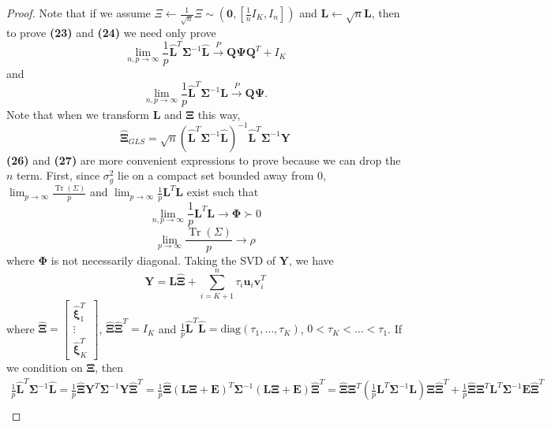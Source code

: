 \documentclass{article}
\DeclareMathOperator{\Tr}{Tr}
\begin{document}
\begin{proof}
Note that if we assume $\Xi \leftarrow \frac{1}{\sqrt{n}}\Xi \sim \left( \bm{0},\left[\frac{1}{n} I_K, I_n \right] \right)$ and $\bm{L} \leftarrow \sqrt{n}\bm{L}$, then to prove \textbf{(23)} and \textbf{(24)} we need only prove
\begin{equation}
\lim_{n,p \to \infty} \frac{1}{p}\hat{\bm{L}}^T \bm{\Sigma}^{-1}\hat{\bm{L}} \stackrel{P}{\to} \bm{Q}\bm{\Psi}\bm{Q}^T + I_K
\end{equation}
and
\begin{equation}
\lim_{n,p \to \infty} \frac{1}{p}\hat{\bm{L}}^T \bm{\Sigma}^{-1}\bm{L} \stackrel{P}{\to} \bm{Q}\bm{\Psi}.
\end{equation}
Note that when we transform $\bm{L}$ and $\bm{\Xi}$ this way,
\begin{equation}
\hat{\bm{\Xi}}_{GLS} = \sqrt{n} \left( \hat{\bm{L}}^T \bm{\Sigma}^{-1}\hat{\bm{L}} \right)^{-1}\hat{\bm{L}}^T \bm{\Sigma}^{-1}\bm{Y}
\end{equation}
\textbf{(26)} and \textbf{(27)} are more convenient expressions to prove because we can drop the $n$ term. First, since $\sigma_{g}^2$ lie on a compact set bounded away from 0, $\lim_{p \to \infty} \frac{\Tr\left( \Sigma \right)}{p}$ and $\lim_{p \to \infty} \frac{1}{p}\bm{L}^T \bm{L}$ exist such that
\begin{equation}
\lim_{n, p \to \infty} \frac{1}{p}\bm{L}^T \bm{L} \to \bm{\Phi} \succ 0
\end{equation} 
\begin{equation}
\lim_{p \to \infty} \frac{\Tr\left( \Sigma \right)}{p} \to \rho
\end{equation}
where $\bm{\Phi}$ is not necessarily diagonal. Taking the SVD of $\bm{Y}$, we have
\begin{equation}
\bm{Y} = \hat{\bm{L}}\hat{\bm{\Xi}} + \sum\limits_{i=K+1}^n \tau_i \bm{u}_i \bm{v}_i^T
\end{equation}
where $\hat{\bm{\Xi}} = \left[ \begin{matrix}
\hat{\bm{\xi}}_1^T \\
\vdots\\
\hat{\bm{\xi}}_K^T
\end{matrix} \right]$, $\hat{\bm{\Xi}} \hat{\bm{\Xi}}^T = I_K$ and $\frac{1}{p}\hat{\bm{L}}^T \hat{\bm{L}} = \text{diag}\left( \tau_1, \ldots, \tau_K \right)$, $0 < \tau_K < \ldots < \tau_1$. If we condition on $\bm{\Xi}$, then
\begin{multline}
\frac{1}{p}\hat{\bm{L}}^T \bm{\Sigma}^{-1}\hat{\bm{L}} = \frac{1}{p}\hat{\bm{\Xi}} \bm{Y}^T \bm{\Sigma}^{-1} \bm{Y}\hat{\bm{\Xi}}^T =  \frac{1}{p}\hat{\bm{\Xi}} \left( \bm{L}\bm{\Xi} + \bm{E} \right)^T \bm{\Sigma}^{-1}\left( \bm{L}\bm{\Xi} + \bm{E} \right) \hat{\bm{\Xi}}^T = \hat{\bm{\Xi}} \bm{\Xi}^T \left( \frac{1}{p}\bm{L}^T\bm{\Sigma}^{-1}\bm{L} \right) \bm{\Xi} \hat{\bm{\Xi}}^T + \frac{1}{p}\hat{\bm{\Xi}}\bm{\Xi}^T \bm{L}^T \bm{\Sigma}^{-1}\bm{E} \hat{\bm{\Xi}}^T \\

\end{multline}
\end{proof}
\end{document}
